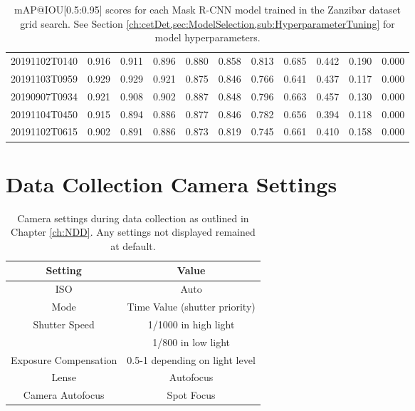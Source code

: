 \begin{table}[!ht]
{\begin{tabular}{ccccccccccc}
			20191102T0140 &          0.916 &          0.911 &          0.896 &          0.880 &          0.858 &          0.813 &          0.685 &          0.442 &          0.190 &          0.000 \\
			20191103T0959 &          0.929 &          0.929 &          0.921 &          0.875 &          0.846 &          0.766 &          0.641 &          0.437 &          0.117 &          0.000 \\
			20190907T0934 &          0.921 &          0.908 &          0.902 &          0.887 &          0.848 &          0.796 &          0.663 &          0.457 &          0.130 &          0.000 \\
			20191104T0450 &          0.915 &          0.894 &          0.886 &          0.877 &          0.846 &          0.782 &          0.656 &          0.394 &          0.118 &          0.000 \\
			20191102T0615 &          0.902 &          0.891 &          0.886 &          0.873 &          0.819 &          0.745 &          0.661 &          0.410 &          0.158 &          0.000 \\
			\bottomrule
		\end{tabular}}
	\caption{mAP@IOU[0.5:0.95] scores for each Mask R-CNN model trained in the Zanzibar dataset grid search. See Section \ref{ch:cetDet,sec:ModelSelection,sub:HyperparameterTuning} for model hyperparameters.}
\end{table}

\newpage
\section{Data Collection Camera Settings}\label{app:DataCollectionCameraSettings}

\begin{table}[!ht]
	\centering
	\begin{tabular}{cc}\toprule
		\textbf{Setting}               & \textbf{Value}                 \\\midrule
		ISO                            & Auto                           \\
		Mode                           & Time Value (shutter priority)  \\
		\multirow{2}{*}{Shutter Speed} & 1/1000 in high light           \\
		& 1/800 in low light             \\
		Exposure Compensation          & 0.5-1 depending on light level \\
		Lense                          & Autofocus                      \\
		Camera Autofocus               & Spot Focus               \\\bottomrule     
	\end{tabular}
	\caption{Camera settings during data collection as outlined in Chapter \ref{ch:NDD}. Any settings not displayed remained at default.}
\end{table}

